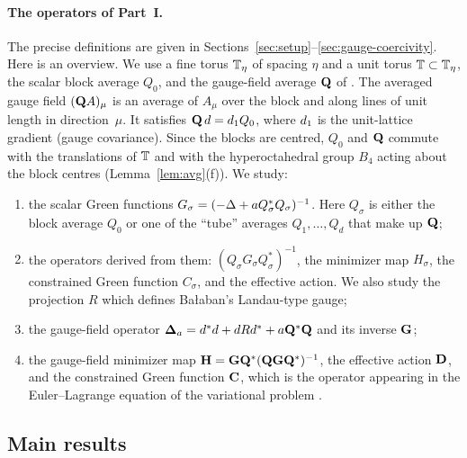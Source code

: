 \paragraph{The operators of Part~I.} The precise definitions are given in Sections~\ref{sec:setup}--\ref{sec:gauge-coercivity}. Here is an overview. We use a fine torus $\mathbb T_\eta$ of spacing $\eta$ and a unit torus $\mathbb T\subset\mathbb T_\eta$, the scalar block average $Q_0$, and the gauge-field average $\mathbf Q$ of \cite{BalPropI}. The averaged gauge field $(\mathbf Q A)_\mu$ is an average of $A_\mu$ over the block and along lines of unit length in direction~$\mu$. It satisfies $\mathbf Q\,d=d_1 Q_0$, where $d_1$ is the unit-lattice gradient (gauge covariance). Since the blocks are centred, $Q_0$ and $\mathbf Q$ commute with the translations of $\mathbb T$ and with the hyperoctahedral group $B_4$ acting about the block centres (Lemma~\ref{lem:avg}(f)). We study:
\begin{enumerate}[label=(\roman*)]
\item the scalar Green functions $G_\sigma=(-\Delta+aQ_\sigma^*Q_\sigma)^{-1}$. Here $Q_\sigma$ is either the block average $Q_0$ or one of the ``tube'' averages $Q_1,\dots,Q_d$ that make up $\mathbf Q$;
\item the operators derived from them: $(Q_\sigma G_\sigma Q_\sigma^*)^{-1}$, the minimizer map $H_\sigma$, the constrained Green function $C_\sigma$, and the effective action. We also study the projection $R$ which defines Ba\l aban's Landau-type gauge;
\item the gauge-field operator $\boldsymbol{\Delta}_a=d^*d+dRd^*+a\mathbf Q^*\mathbf Q$ and its inverse $\mathbf G$;
\item the gauge-field minimizer map $\mathbf H=\mathbf G\mathbf Q^*(\mathbf Q\mathbf G\mathbf Q^*)^{-1}$, the effective action $\mathbf D$, and the constrained Green function $\mathbf C$, which is the operator appearing in the Euler--Lagrange equation of the variational problem \cite[(110)--(111)]{BalVar}.
\end{enumerate}

\subsection{Main results}\label{ss:1.3}

